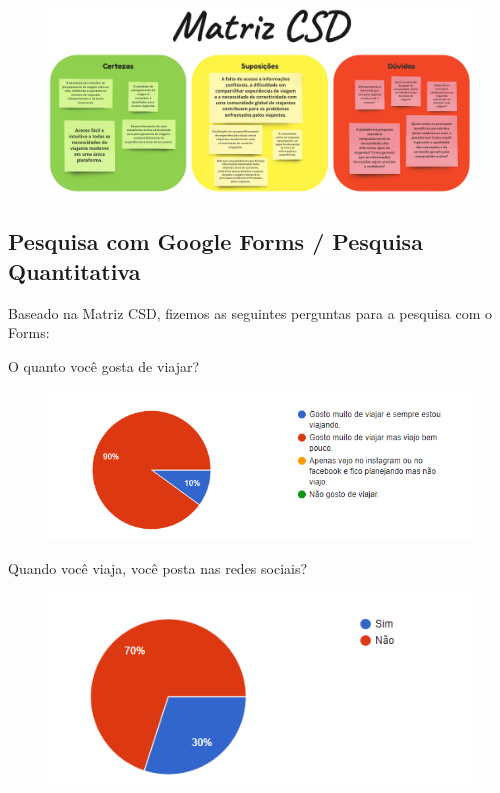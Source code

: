 \documentclass{article}
\begin{document}
\begin{figure}[H]
      \centering
      \includegraphics [width=1\textwidth]{IMGDOC/Matriz CSD.png}
      \label{csd imagem}
\end{figure}

{\subsection{Pesquisa com Google Forms / Pesquisa Quantitativa}}
Baseado na Matriz CSD, fizemos as seguintes perguntas para a pesquisa com o Forms:
\bigskip

O quanto você gosta de viajar?
\begin{figure}[H]
      \centering
      \includegraphics [width=1\textwidth]{IMGDOC/Quanto Gosta.png}
      \label{Pesquisa1}
\end{figure}

Quando você viaja, você posta nas redes sociais?
\begin{figure}[H]
      \centering
      \includegraphics [width=1\textwidth]{IMGDOC/Redes sociais.png}
      \label{Pesquisa2}
\end{figure}
\end{document}
